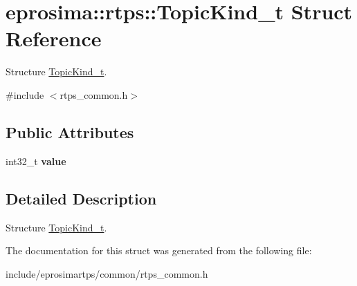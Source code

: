 \hypertarget{structeprosima_1_1rtps_1_1_topic_kind__t}{\section{eprosima\-:\-:rtps\-:\-:\-Topic\-Kind\-\_\-t \-Struct \-Reference}
\label{structeprosima_1_1rtps_1_1_topic_kind__t}
}


\-Structure \hyperlink{structeprosima_1_1rtps_1_1_topic_kind__t}{\-Topic\-Kind\-\_\-t}.  




{\ttfamily \#include $<$rtps\-\_\-common.\-h$>$}

\subsection*{\-Public \-Attributes}
\begin{DoxyCompactItemize}
\item 
\hypertarget{structeprosima_1_1rtps_1_1_topic_kind__t_afbec964248e4d8ea97271f88a5de66eb}{int32\-\_\-t {\bfseries value}}\label{structeprosima_1_1rtps_1_1_topic_kind__t_afbec964248e4d8ea97271f88a5de66eb}

\end{DoxyCompactItemize}


\subsection{\-Detailed \-Description}
\-Structure \hyperlink{structeprosima_1_1rtps_1_1_topic_kind__t}{\-Topic\-Kind\-\_\-t}. 

\-The documentation for this struct was generated from the following file\-:\begin{DoxyCompactItemize}
\item 
include/eprosimartps/common/rtps\-\_\-common.\-h\end{DoxyCompactItemize}
